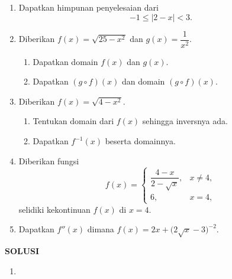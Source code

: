 \documentclass[11pt,openany,a4paper]{article}
\renewcommand{\headrulewidth}{0pt}
\begin{document}
\begin{enumerate}
    \item Dapatkan himpunan penyelesaian dari
          \[
              -1 \leq |2 - x| < 3.
          \]

    \item Diberikan $f(x) = \sqrt{25 - x^2}$ dan $g(x) = \dfrac{1}{x^2}$.
          \begin{enumerate}
              \item Dapatkan domain $f(x)$ dan $g(x)$.
              \item Dapatkan $(g \circ f)(x)$ dan domain $(g \circ f)(x)$.
          \end{enumerate}

    \item Diberikan $f(x) = \sqrt{4 - x^2}$.
          \begin{enumerate}
              \item Tentukan domain dari $f(x)$ sehingga inversnya ada.
              \item Dapatkan $f^{-1}(x)$ beserta domainnya.
          \end{enumerate}

    \item Diberikan fungsi
          \[
              f(x) =
              \begin{cases}
                  \dfrac{4 - x}{2 - \sqrt{x}}, & x \neq 4, \\[1em]
                  6,                           & x = 4,
              \end{cases}
          \]
          selidiki kekontinuan $f(x)$ di $x = 4$.

    \item Dapatkan $f''(x)$ dimana
          $
              f(x) = 2x + \bigl( 2\sqrt{x} - 3 \bigr)^{-2}.
          $

\end{enumerate}



\newpage
{}
{\centering\textbf{SOLUSI}}
\renewcommand{\arraystretch}{1.5}
\renewcommand{\headrulewidth}{1pt}
\begin{enumerate}
    \item
\end{enumerate}
\end{document}
